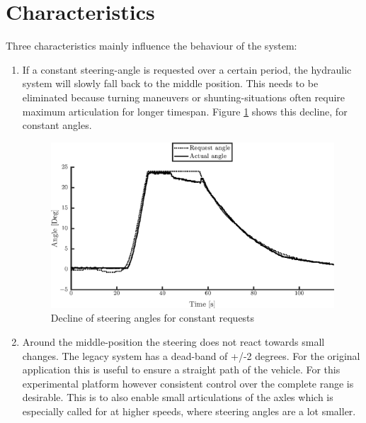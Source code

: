 \documentclass[root.tex]{subfiles}
\begin{document}
	
	{\pagestyle{empty}}
	\section{Characteristics}
	\label{chap:Delays}
	
	Three characteristics mainly influence the behaviour of the system: 
	
	\begin{enumerate}
		\item If a constant steering-angle is requested over a certain period, the hydraulic system will slowly fall back to the middle position. This needs to be eliminated because turning maneuvers or shunting-situations often require maximum articulation for longer timespan. Figure \ref{fig:Constant_request} shows this decline, for constant angles.
		
		\begin{figure}[!h]
			
			\includegraphics[width=1\linewidth]{front}
			\caption[Decline of steering angles for constant requests]{Decline of steering angles for constant requests}
			
			\label{fig:Constant_request}
		\end{figure}
		
		\item Around the middle-position the steering does not react towards small changes. The legacy system has a dead-band of +/-2 degrees. For the original application this is useful to ensure a straight path of the vehicle. For this experimental platform however consistent control over the complete range is desirable. This is to also enable small articulations of the axles which is especially called for at higher speeds, where steering angles are a lot smaller. 
		

\end{enumerate}
\end{document}
